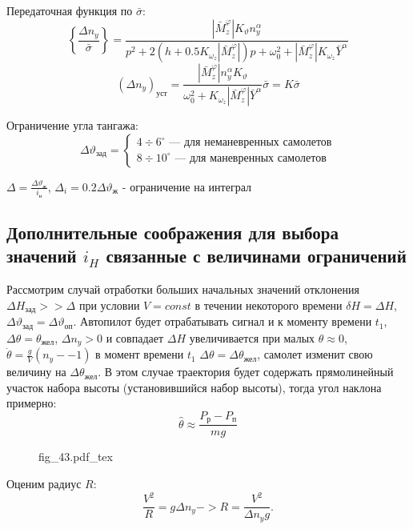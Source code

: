 \documentclass{article}
\newcommand{\incfig}[1]{
    {#1.pdf_tex}
}
\begin{document}
Передаточная функция по $\bar{\sigma}$:
\[
	\left\{\frac{\Delta n_y}{\bar{\sigma}} \right\} =\frac{|\bar{M}_z^\varphi|
	K_{\vartheta} n_y^\alpha}{ p^2 + 2(h + 0.5 K_{\omega_z} |
	\bar{M}_z^{\varphi} |)p + \omega_0^2 + | \bar{M}_z^{\varphi}| K_{\omega_z}
	\bar{Y}^\alpha}
\]
\[
	\left( \Delta n_y\right)_\text{уст} = \frac{| \bar{M}_z^{\varphi}|
	n_y^\alpha K_\vartheta}{\omega_0^2 + K_{\omega_z} | \bar{M}_z^{\varphi} |
	\bar{Y}^\alpha} \bar{\sigma} = K \bar{\sigma}
\]

Ограничение угла тангажа:
\begin{equation}
	\Delta \vartheta_\text{зад} =
	\begin{cases}
		4 \div 6^\circ \text{ --- для неманевренных самолетов} \\
		8 \div 10^\circ \text{ --- для маневренных самолетов}
	\end{cases}
\end{equation}

$\Delta =\frac{\Delta \vartheta_\text{ж}}{i_\text{н}}$, $\Delta_i = 0.2 \Delta
	\vartheta_\text{ж}$ - ограничение на интеграл

\subsection{Дополнительные соображения для выбора значений
	\texorpdfstring{$i_H$}{Lg} связанные с величинами ограничений}
Рассмотрим случай отработки больших начальных значений отклонения $\Delta
	H_\text{зад} >> \Delta$ при условии $V = const$ в течении некоторого времени
$\delta H = \Delta H$, $\Delta \vartheta_\text{зад}  = \Delta
	\vartheta_\text{оп}$. Автопилот будет отрабатывать сигнал и к моменту времени
$t_1$, $\Delta \theta = \theta_\text{жел}$, $ \Delta n_y  >0 $ и совпадает
$\Delta H$ увеличивается при малых $\theta \approx 0$, $ \dot{\theta} =
	\frac{g}{V}(n_y - -1)$ в момент времени $t_1$ $\Delta \theta = \Delta
	\theta_\text{жел}$, самолет изменит свою величину на $\Delta
	\theta_\text{жел}$. В этом случае траектория будет содержать прямолинейный
участок набора высоты (установившийся набор высоты), тогда угол наклона
примерно:
\[
	\hat{\theta} \approx \frac{P_\text{р} - P_\text{п}}{mg}
\]

\begin{figure}[H]
	\centering
	\incfig{fig_43}
	\label{fig:fig_43}
\end{figure}

Оценим радиус $R$:
\[
	\frac{V^2}{R} = g \Delta n_y -> R = \frac{V^2}{ \Delta n_y g}
	.\]
\end{document}
